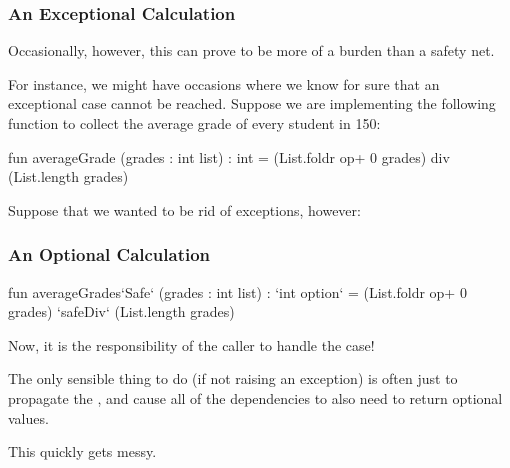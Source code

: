\documentclass[aspectratio=169]{beamer}
\begin{document}
\begin{frame}[fragile]
  \frametitle{An Exceptional Calculation}

  Occasionally, however, this can prove to be more of a burden than a
  safety net.

  \pause
  \vspace{\fill}

  For instance, we might have occasions where we know for sure that
  an exceptional case cannot be reached. Suppose we are implementing
  the following function to collect the average grade of every
  student in 150:

  \pause
  \begin{codeblock}
    fun averageGrade (grades : int list) : int =
      (List.foldr op+ 0 grades)
      div
      (List.length grades)
  \end{codeblock}

  \pause
  \vspace{\fill}

  Suppose that we wanted to be rid of exceptions, however:
\end{frame}

\begin{frame}[fragile]
  \frametitle{An Optional Calculation}

  \begin{codeblock}
    fun averageGrades`Safe` (grades : int list) : `int option` =
      (List.foldr op+ 0 grades)
      `safeDiv`
      (List.length grades)
  \end{codeblock}

  \pause
  \vspace{\fill}

  Now, it is the responsibility of the caller to handle the  case!

  \pause
  \vspace{\fill}

  The only sensible thing to do (if not raising an exception) is often just to
  propagate the , and cause all of the dependencies to also need
  to return optional values.

  \pause
  \vspace{\fill}

  This quickly gets messy.
\end{frame}
\end{document}
